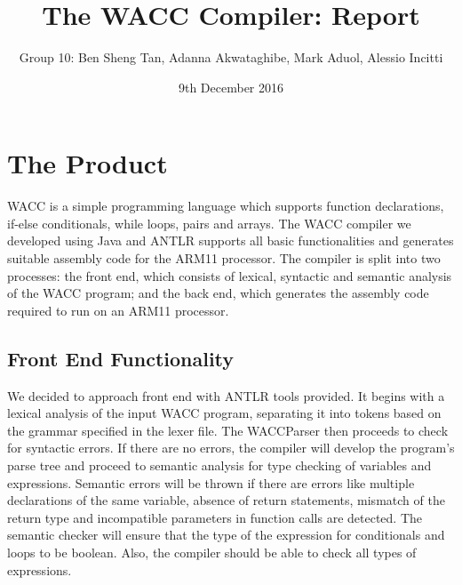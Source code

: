\documentclass[a4paper]{article}
\theoremstyle{definition}
\begin{document}
\title{The WACC Compiler: Report}
\date{9th December 2016}
\author{
Group 10: Ben Sheng Tan, Adanna Akwataghibe, Mark Aduol, Alessio Incitti
}

\maketitle
\section{The Product}
WACC is a simple programming language which supports function declarations, if-else conditionals, while loops, pairs and arrays.
The WACC compiler we developed using Java and ANTLR supports all basic functionalities and generates suitable assembly code for the ARM11 processor. The compiler is split into two processes: the front end, which consists of lexical, syntactic and semantic analysis of the WACC program; and the back end, which generates the assembly code required to run on an ARM11 processor.

\subsection{Front End Functionality}
We decided to approach front end with ANTLR tools provided. It begins with a lexical analysis of the input WACC program, separating it into tokens based on the grammar specified in the lexer file. The WACCParser then proceeds to check for syntactic errors. If there are no errors, the compiler will develop the program's parse tree and proceed to semantic analysis for type checking of variables and expressions. Semantic errors will be thrown if there are errors like multiple declarations of the same variable, absence of return statements, mismatch of the return type and incompatible parameters in function calls are detected. The semantic checker will ensure that the type of the expression for conditionals and loops to be boolean. Also, the compiler should be able to check all types of expressions.
\end{document}
